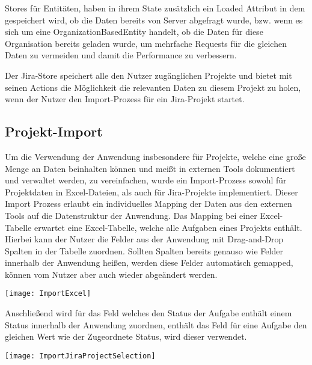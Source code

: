 Stores für Entitäten, haben in ihrem State zusätzlich ein Loaded Attribut in dem gespeichert wird, ob die Daten bereits von Server abgefragt wurde, bzw. wenn es sich um eine OrganizationBasedEntity handelt, ob die Daten für diese Organisation bereits geladen wurde, um mehrfache Requests für die gleichen Daten zu vermeiden und damit die Performance zu verbessern.

Der Jira-Store speichert alle den Nutzer zugänglichen Projekte und bietet mit seinen Actions die Möglichkeit die relevanten Daten zu diesem Projekt zu holen, wenn der Nutzer den Import-Prozess für ein Jira-Projekt startet.

\subsection{Projekt-Import}
Um die Verwendung der Anwendung insbesondere für Projekte, welche eine große Menge an Daten beinhalten können und meißt in externen Tools dokumentiert und verwaltet werden, zu vereinfachen, wurde ein Import-Prozess sowohl für Projektdaten in Excel-Dateien, als auch für Jira-Projekte implementiert. Dieser Import Prozess erlaubt ein individuelles Mapping der Daten aus den externen Tools auf die Datenstruktur der Anwendung. Das Mapping bei einer Excel-Tabelle erwartet eine Excel-Tabelle, welche alle Aufgaben eines Projekts enthält. Hierbei kann der Nutzer  die Felder aus der Anwendung mit Drag-and-Drop Spalten in der Tabelle zuordnen. Sollten Spalten bereits genauso wie Felder innerhalb der Anwendung heißen, werden diese Felder automatisch gemapped, können vom Nutzer aber auch wieder abgeändert werden.

\vspace{20pt}
\begin{center}
    \begin{minipage}{1\linewidth}
        \texttt{[image: ImportExcel]}
    \end{minipage}
\end{center}
\vspace{20pt}

Anschließend wird für das Feld welches den Status der Aufgabe enthält einem Status innerhalb der Anwendung zuordnen, enthält das Feld für eine Aufgabe den gleichen Wert wie der Zugeordnete Status, wird dieser verwendet.

\vspace{20pt}
\begin{center}
    \begin{minipage}{1\linewidth}
        \texttt{[image: ImportJiraProjectSelection]}
    \end{minipage}
\end{center}
\vspace{20pt}

